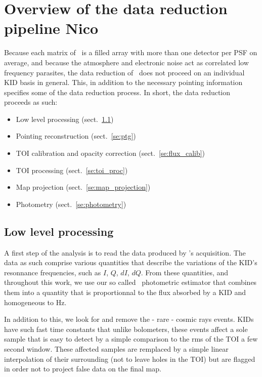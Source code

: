 

\section{Overview of the data reduction pipeline {\color{blue} Nico}}

Because each matrix of \nika\ is a filled array with more than one detector per
PSF on average, and because the atmosphere and electronic noise act as
correlated low frequency parasites, the data reduction of \nika\ does not
proceed on an individual KID basis in general. This, in addition to the
necessary pointing information specifies some of the data reduction
process. In short, the data reduction proceeds as such:

\begin{itemize}
\item Low level processing (sect.~\ref{se:ll_proc})
\item Pointing reconstruction (sect.~\ref{se:ptg})
\item TOI calibration and opacity correction (sect.~\ref{se:flux_calib})
\item TOI processing (sect.~\ref{se:toi_proc})
\item Map projection (sect.~\ref{se:map_projection})
\item Photometry (sect.~\ref{se:photometry})
\end{itemize}

\subsection{Low level processing}
\label{se:ll_proc}

A first step of the analysis is to read the data produced by \nika's
acquisition. The data as such comprise various quantities that describe the
variations of the KID's resonnance frequencies, such as $I$, $Q$, $dI$,
$dQ$. From these quantities, and throughout this work, we use our so called
\rf\ photometric estimator that combines them into a quantity that is
proportionnal to the flux absorbed by a KID \cite{Calvo13} and homogeneous to Hz.

In addition to this, we look for and remove the - rare - cosmic rays
events. KIDs have such fast time constants that unlike bolometers, these events
affect a sole sample that is easy to detect by a simple comparison to the rms of
the TOI a few second window. These affected samples are remplaced by a simple
linear interpolation of their surrounding (not to leave holes in the TOI) but
are flagged in order not to project false data on the final map.

